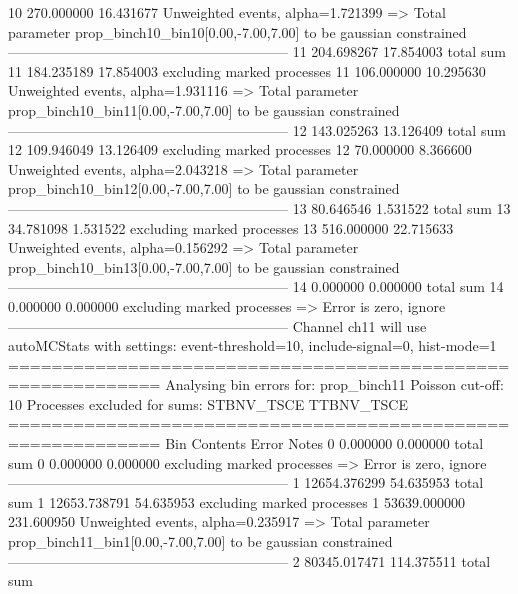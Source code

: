 10         270.000000      16.431677       Unweighted events, alpha=1.721399
  => Total parameter prop_binch10_bin10[0.00,-7.00,7.00] to be gaussian constrained
------------------------------------------------------------
11         204.698267      17.854003       total sum                     
11         184.235189      17.854003       excluding marked processes    
11         106.000000      10.295630       Unweighted events, alpha=1.931116
  => Total parameter prop_binch10_bin11[0.00,-7.00,7.00] to be gaussian constrained
------------------------------------------------------------
12         143.025263      13.126409       total sum                     
12         109.946049      13.126409       excluding marked processes    
12         70.000000       8.366600        Unweighted events, alpha=2.043218
  => Total parameter prop_binch10_bin12[0.00,-7.00,7.00] to be gaussian constrained
------------------------------------------------------------
13         80.646546       1.531522        total sum                     
13         34.781098       1.531522        excluding marked processes    
13         516.000000      22.715633       Unweighted events, alpha=0.156292
  => Total parameter prop_binch10_bin13[0.00,-7.00,7.00] to be gaussian constrained
------------------------------------------------------------
14         0.000000        0.000000        total sum                     
14         0.000000        0.000000        excluding marked processes    
  => Error is zero, ignore      
------------------------------------------------------------
Channel ch11 will use autoMCStats with settings: event-threshold=10, include-signal=0, hist-mode=1
============================================================
Analysing bin errors for: prop_binch11
Poisson cut-off: 10
Processes excluded for sums: STBNV_TSCE TTBNV_TSCE
============================================================
Bin        Contents        Error           Notes                         
0          0.000000        0.000000        total sum                     
0          0.000000        0.000000        excluding marked processes    
  => Error is zero, ignore      
------------------------------------------------------------
1          12654.376299    54.635953       total sum                     
1          12653.738791    54.635953       excluding marked processes    
1          53639.000000    231.600950      Unweighted events, alpha=0.235917
  => Total parameter prop_binch11_bin1[0.00,-7.00,7.00] to be gaussian constrained
------------------------------------------------------------
2          80345.017471    114.375511      total sum                     
